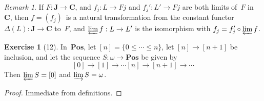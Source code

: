 \documentclass[letterpaper,12pt]{article}
\newcommand{\after}{\circ}
\newcommand{\limit}{\varprojlim}
\newcommand{\colimit}{\varinjlim}
\newcommand{\cat}[1]{\mathbf{#1}}
\newcommand{\C}{\cat{C}}
\newcommand{\J}{\cat{J}}
\newcommand{\Pos}{\cat{Pos}}
\theoremstyle{definition}
\newtheorem*{exer}{Exercise}
\theoremstyle{remark}
\newtheorem*{rmk}{Remark}
\theoremstyle{direction}
\begin{document}
\begin{rmk}
If \(F:\J\to\C\), and \(f_j:L\to Fj\) and \(f_j':L'\to Fj\) are both limits of~\(F\) in~\(\C\), then \(f=(f_j)\)~is a natural transformation from the constant functor \(\Delta(L):\J\to\C\) to~\(F\), and \(\limit f:L\to L'\) is the isomorphism with \(f_j=f_j'\after\limit f\).
\end{rmk}

\begin{exer}[12]
In~\(\Pos\), let \([n]=\{0\le\cdots\le n\}\), let \([n]\to[n+1]\) be inclusion, and let the sequence \(S:\omega\to\Pos\) be given by
\[[0]\to[1]\to\cdots[n]\to[n+1]\to\cdots\]
Then \(\limit S=[0]\) and \(\colimit S=\omega\).
\end{exer}
\begin{proof}
Immediate from definitions.
\end{proof}
\end{document}
